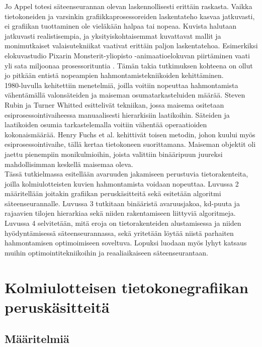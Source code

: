 \documentclass[a4paper, 12pt, titlepage]{article}
\begin{document}
Jo Appel totesi säteenseurannan olevan laskennollisesti erittäin raskasta. Vaikka tietokoneiden ja varsinkin grafiikkaprosessoreiden laskentateho kasvaa jatkuvasti, ei grafiikan tuottaminen ole vieläkään halpaa tai nopeaa. Kuvista halutaan jatkuvasti realistisempia, ja yksityiskohtaisemmat kuvattavat mallit ja monimutkaiset valaisutekniikat vaativat erittäin paljon laskentatehoa. Esimerkiksi elokuvastudio Pixarin Monsterit-yliopisto \mbox{-animaatioelokuvan} piirtäminen vaati yli sata miljoonaa prosessorituntia \citep{monsterit}. Tämän takia tutkimuksen kohteena on ollut jo pitkään entistä nopeampien hahmontamistekniikoiden kehittäminen.\\

1980-luvulla kehitettiin menetelmiä, joilla voitiin nopeuttaa hahmontamista vähentämällä valonsäteiden ja maiseman osumatarkasteluiden määrää. Steven Rubin ja Turner Whitted esittelivät tekniikan, jossa maisema ositetaan esiprosessointivaiheessa manuaalisesti hierarkisiin laatikoihin. Säteiden ja laatikoiden osumia tarkastelemalla voitiin vähentää operaatioiden kokonaismäärää. \citep[.]{rubin} Henry Fuchs et al. kehittivät toisen metodin, johon kuului myös esiprosessointivaihe, tällä kertaa tietokoneen suorittamana. Maiseman objektit oli jaettu pienempiin monikulmioihin, joista valittiin binääripuun juureksi mahdollisimman keskellä maisemaa oleva. \citep[.]{fuchs}\\

Tässä tutkielmassa esitellään avaruuden jakamiseen perustuvia tietorakenteita, joilla kolmiulotteisten kuvien hahmontamista voidaan nopeuttaa. Luvussa 2 määritellään joitakin grafiikan peruskäsitteitä sekä esitetään algoritmi säteenseurannalle. Luvussa 3 tutkitaan binääristä avaruusjakoa, kd-puuta ja rajaavien tilojen hierarkiaa sekä niiden rakentamiseen 	liittyviä algoritmeja. Luvussa 4 selvitetään, mitä eroja on tietorakenteiden alustamisessa ja niiden hyödyntämisessä säteenseurannassa, sekä yritetään löytää niistä parhaiten hahmontamisen optimoimiseen soveltuva. Lopuksi luodaan myös lyhyt katsaus muihin optimointitekniikoihin ja reaaliaikaiseen säteenseurantaan.

\newpage
\section{Kolmiulotteisen tietokonegrafiikan peruskäsitteitä}
\subsection{Määritelmiä}
\end{document}
